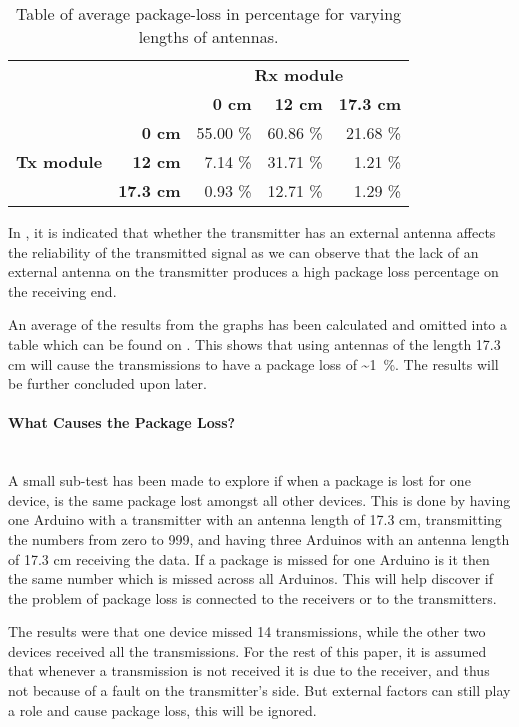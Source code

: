 \begin{table}[ht]
\centering
\begin{tabular}{r r r r r}    \toprule
 && \multicolumn{3}{c}{\textbf{Rx module}}\\
 && \textbf{0 cm}    & \textbf{12 cm}    & \textbf{17.3 cm}  \\\midrule
\multirow{3}{*}{\textbf{Tx module}}  &\textbf{0 cm} & 55.00 \%   & 60.86 \% & 21.68 \% \\ 
 &\textbf{12 cm} & 7.14 \% & 31.71 \% & 1.21 \%  \\ 
 &\textbf{17.3 cm} & 0.93 \% & 12.71 \% & 1.29 \%  \\\bottomrule
 \hline
\end{tabular} 
\caption{Table of average package-loss in percentage for varying lengths of antennas.}
\label{tbl:packageloss}
\end{table}

\bigskip
\noindent
In , it is indicated that whether the transmitter has an external antenna affects the reliability of the transmitted signal as we can observe that the lack of an external antenna on the transmitter produces a high package loss percentage on the receiving end.

An average of the results from the graphs has been calculated and omitted into a table which can be found on . 
This shows that using antennas of the length 17.3 cm will cause the transmissions to have a package loss of \textasciitilde1~\%.
The results will be further concluded upon later.

\paragraph{What Causes the Package Loss?}\label{par:wctpl}\hfill \\
A small sub-test has been made to explore if when a package is lost for one device, is the same package lost amongst all other devices.
This is done by having one Arduino with a transmitter with an antenna length of 17.3 cm, transmitting the numbers from zero to 999, and having three Arduinos with an antenna length of 17.3 cm receiving the data. 
If a package is missed for one Arduino is it then the same number which is missed across all Arduinos.
This will help discover if the problem of package loss is connected to the receivers or to the transmitters.

The results were that one device missed 14 transmissions, while the other two devices received all the transmissions.
For the rest of this paper, it is assumed that whenever a transmission is not received it is due to the receiver, and thus not because of a fault on the transmitter's side.
But external factors can still play a role and cause package loss, this will be ignored.

